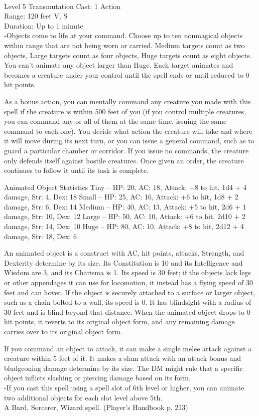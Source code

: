 \documentclass[10pt,twocolumn]{report}
\begin{document}
 \\
Level 5 \quad Transmutation \quad Cast: 1 Action\\
Range: 120 feet \quad V, S\\
Duration: Up to 1 minute \quad \\
-Objects come to life at your command. 
Choose up to ten nonmagical objects within range that are not being worn or carried. Medium targets count as two objects, Large targets count as four objects, Huge targets count as eight objects. You can’t animate any object larger than Huge. Each target animates and becomes a creature under your control until the spell ends or until reduced to 0 hit points. 

As a bonus action, you can mentally command any creature you made with this spell if the creature is within 500 feet of you (if you control multiple creatures, you can command any or all of them at the same time, issuing the same command to each one). You decide what action the creature will take and where it will move during its next turn, or you can issue a general command, such as to guard a particular chamber or corridor. If you issue no commands, the creature only defends itself against hostile creatures. Once given an order, the creature continues to follow it until its task is complete. 

Animated Object Statistics 
Tiny – HP: 20, AC: 18, Attack: +8 to hit, 1d4 + 4 damage, Str: 4, Dex: 18 
Small – HP: 25, AC: 16, Attack: +6 to hit, 1d8 + 2 damage, Str: 6, Dex: 14 
Medium – HP: 40, AC: 13, Attack: +5 to hit, 2d6 + 1 damage, Str: 10, Dex: 12 
Large – HP: 50, AC: 10, Attack: +6 to hit, 2d10 + 2 damage, Str: 14, Dex: 10 
Huge – HP: 80, AC: 10, Attack: +8 to hit, 2d12 + 4 damage, Str: 18, Dex: 6 

An animated object is a construct with AC, hit points, attacks, Strength, and Dexterity determine by its size. Its Constitution is 10 and its Intelligence and Wisdom are 3, and its Charisma is 1. Its speed is 30 feet; if the objects lack legs or other appendages it can use for locomotion, it instead has a flying speed of 30 feet and can hover. If the object is securely attached to a surface or larger object, such as a chain bolted to a wall, its speed is 0. It has blindsight with a radius of 30 feet and is blind beyond that distance. When the animated object drops to 0 hit points, it reverts to its original object form, and any remaining damage carries over to its original object form. 

If you command an object to attack, it can make a single melee attack against a creature within 5 feet of it. It makes a slam attack with an attack bonus and bludgeoning damage determine by its size. The DM might rule that a specific object inflicts slashing or piercing damage based on its form.\\
-If you cast this spell using a spell slot of 6th level or higher, you can animate two additional objects for each slot level above 5th.\\
A Bard, Sorcerer, Wizard spell. (Player's Handbook p. 213) \\
\end{document}
